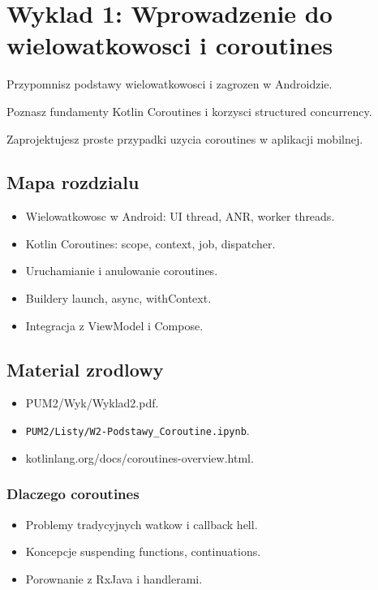 \chapter{Wyklad 1: Wprowadzenie do wielowatkowosci i coroutines}

\begin{learningobjectives}
  \item Przypomnisz podstawy wielowatkowosci i zagrozen w Androidzie.
  \item Poznasz fundamenty Kotlin Coroutines i korzysci structured concurrency.
  \item Zaprojektujesz proste przypadki uzycia coroutines w aplikacji mobilnej.
\end{learningobjectives}

\section{Mapa rozdzialu}
\begin{itemize}
  \item Wielowatkowosc w Android: UI thread, ANR, worker threads.
  \item Kotlin Coroutines: scope, context, job, dispatcher.
  \item Uruchamianie i anulowanie coroutines.
  \item Buildery launch, async, withContext.
  \item Integracja z ViewModel i Compose.
\end{itemize}

\section{Material zrodlowy}
\begin{itemize}
  \item PUM2/Wyk/Wyklad2.pdf.
  \item \texttt{PUM2/Listy/W2-Podstawy\_Coroutine.ipynb}.
  \item kotlinlang.org/docs/coroutines-overview.html.
\end{itemize}

\subsection{Dlaczego coroutines}
\begin{itemize}
  \item Problemy tradycyjnych watkow i callback hell.
  \item Koncepcje suspending functions, continuations.
  \item Porownanie z RxJava i handlerami.
\end{itemize}


